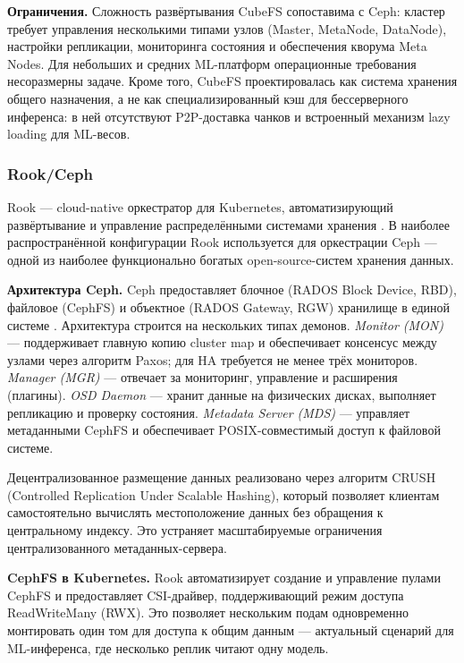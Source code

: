\textbf{Ограничения.} Сложность развёртывания CubeFS сопоставима с Ceph: кластер требует управления несколькими типами узлов (Master, MetaNode, DataNode), настройки репликации, мониторинга состояния и обеспечения кворума Meta Nodes. Для небольших и средних ML-платформ операционные требования несоразмерны задаче. Кроме того, CubeFS проектировалась как система хранения общего назначения, а не как специализированный кэш для бессерверного инференса: в ней отсутствуют P2P-доставка чанков и встроенный механизм lazy loading для ML-весов.

\subsubsection*{Rook/Ceph}

Rook --- cloud-native оркестратор для Kubernetes, автоматизирующий развёртывание и управление распределёнными системами хранения \cite{rook_docs}. В наиболее распространённой конфигурации Rook используется для оркестрации Ceph --- одной из наиболее функционально богатых open-source-систем хранения данных.

\textbf{Архитектура Ceph.} Ceph предоставляет блочное (RADOS Block Device, RBD), файловое (CephFS) и объектное (RADOS Gateway, RGW) хранилище в единой системе \cite{ceph_arch}. Архитектура строится на нескольких типах демонов. \textit{Monitor (MON)} --- поддерживает главную копию cluster map и обеспечивает консенсус между узлами через алгоритм Paxos; для HA требуется не менее трёх мониторов. \textit{Manager (MGR)} --- отвечает за мониторинг, управление и расширения (плагины). \textit{OSD Daemon} --- хранит данные на физических дисках, выполняет репликацию и проверку состояния. \textit{Metadata Server (MDS)} --- управляет метаданными CephFS и обеспечивает POSIX-совместимый доступ к файловой системе.

Децентрализованное размещение данных реализовано через алгоритм CRUSH (Controlled Replication Under Scalable Hashing), который позволяет клиентам самостоятельно вычислять местоположение данных без обращения к центральному индексу. Это устраняет масштабируемые ограничения централизованного метаданных-сервера.

\textbf{CephFS в Kubernetes.} Rook автоматизирует создание и управление пулами CephFS и предоставляет CSI-драйвер, поддерживающий режим доступа ReadWriteMany (RWX). Это позволяет нескольким подам одновременно монтировать один том для доступа к общим данным --- актуальный сценарий для ML-инференса, где несколько реплик читают одну модель.

